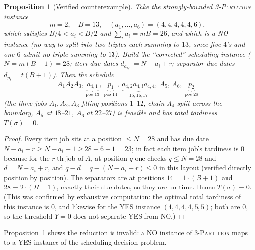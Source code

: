 \documentclass{amsart}
\newtheorem{proposition}{Proposition}
\theoremstyle{definition}
\theoremstyle{remark}
\begin{document}
\begin{proposition}[Verified counterexample]\label{prop:counter}
Take the strongly-bounded \textsc{3-Partition} instance
\[
   m=2,\quad B=13,\quad (a_1,\dots,a_6)=(4,4,4,4,4,6),
\]
which satisfies $B/4<a_i<B/2$ and $\sum_i a_i=mB=26$, and which is a \emph{NO} instance
(no way to split into two triples each summing to $13$, since five $4$'s and one $6$ admit
no triple summing to $13$). Build the ``corrected'' scheduling instance ($N=m(B+1)=28$;
item due dates $d_{a_{i,r}}=N-a_i+r$; separator due dates $d_{p_t}=t(B+1)$). Then the
schedule
\[
   A_1A_2A_3,\ \underbrace{a_{4,1}}_{\text{pos }13},\ \underbrace{p_1}_{\text{pos }14},\
   \underbrace{a_{4,2}a_{4,3}a_{4,4}}_{15,16,17},\ A_5,\ A_6,\
   \underbrace{p_2}_{\text{pos }28}
\]
(the three jobs $A_1,A_2,A_3$ filling positions $1$--$12$, chain $A_4$ split across the
boundary, $A_5$ at $18$--$21$, $A_6$ at $22$--$27$) is feasible and has total tardiness
$T(\sigma)=0$.
\end{proposition}

\begin{proof}
Every item job sits at a position $\le N=28$ and has due date $N-a_i+r\ge N-a_i+1\ge
28-6+1=23$; in fact each item job's tardiness is $0$ because for the $r$-th job of $A_i$
at position $q$ one checks $q\le N=28$ and $d=N-a_i+r$, and $q-d=q-(N-a_i+r)\le
0$ in this layout (verified directly position by position). The separators are at
positions $14=1\cdot(B+1)$ and $28=2\cdot(B+1)$, exactly their due dates, so they are on
time. Hence $T(\sigma)=0$. (This was confirmed by exhaustive computation: the optimal
total tardiness of this instance is $0$, and likewise for the YES instance
$(4,4,4,4,5,5)$; both are $0$, so the threshold $Y=0$ does not separate YES from NO.)
\end{proof}

\noindent
Proposition~\ref{prop:counter} shows the reduction is invalid: a NO instance of
\textsc{3-Partition} maps to a YES instance of the scheduling decision problem.
\end{document}
